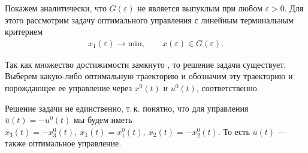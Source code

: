 \documentclass[../main.tex]{subfiles}
\begin{document}
Покажем аналитически, что $G(\varepsilon)$ не является выпуклым при любом $\varepsilon >0$.
Для этого рассмотрим задачу оптимального управления с линейным терминальным критерием
\begin{gather}\label{s1:opt_problem}
	x_1(\varepsilon) \rightarrow \mathrm{min}, \qquad
	x(\varepsilon) \in G(\varepsilon).
\end{gather}

Так как множество достижимости замкнуто \cite{GusZyk2017}, то решение задачи существует. Выберем какую-либо оптимальную траекторию и обозначим эту траекторию и порождающее ее управление через $x^0(t) $ и $ u^0(t) $, соответственно.

Решение задачи не единственно, т.\,к. понятно, что для управления $ \overline{u}(t) = -u^0(t) $ мы будем иметь  $ \overline{x}_3(t) = -x_3^0(t), \ \overline{x}_1(t) = x_1^0(t), \ \overline{x}_2(t) = -x_2^0(t) $. То есть $ \overline{u}(t) $ --- также оптимальное управление.
\end{document}
